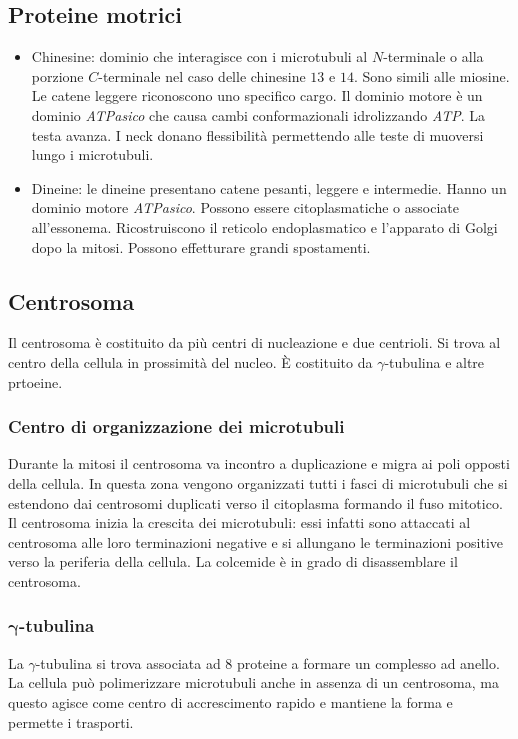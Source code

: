 	\subsection{Proteine motrici}
	\begin{multicols}{2}
		\begin{itemize}
			\item Chinesine: dominio che interagisce con i microtubuli al $N$-terminale o alla porzione $C$-terminale nel caso delle chinesine $13$ e $14$.
				Sono simili alle miosine.
				Le catene leggere riconoscono uno specifico cargo.
				Il dominio motore \`e un dominio \emph{ATPasico} che causa cambi conformazionali idrolizzando \emph{ATP}.
				La testa avanza.
				I neck donano flessibilit\`a permettendo alle teste di muoversi lungo i microtubuli.
			\item Dineine: le dineine presentano catene pesanti, leggere e intermedie.
				Hanno un dominio motore \emph{ATPasico}.
				Possono essere citoplasmatiche o associate all'essonema.
				Ricostruiscono il reticolo endoplasmatico e l'apparato di Golgi dopo la mitosi.
				Possono effetturare grandi spostamenti.
		\end{itemize}
	\end{multicols}

	\subsection{Centrosoma}
	Il centrosoma \`e costituito da pi\`u centri di nucleazione e due centrioli.
	Si trova al centro della cellula in prossimit\`a del nucleo.
	\`E costituito da $\gamma$-tubulina e altre prtoeine.

		\subsubsection{Centro di organizzazione dei microtubuli}
		Durante la mitosi il centrosoma va incontro a duplicazione e migra ai poli opposti della cellula.
		In questa zona vengono organizzati tutti i fasci di microtubuli che si estendono dai centrosomi duplicati verso il citoplasma formando il fuso mitotico.
		Il centrosoma inizia la crescita dei microtubuli: essi infatti sono attaccati al centrosoma alle loro terminazioni negative e si allungano le terminazioni positive verso la periferia della cellula.
		La colcemide \`e in grado di disassemblare il centrosoma.

		\subsubsection{$\mathbf{\gamma}$-tubulina}
		La $\gamma$-tubulina si trova associata ad $8$ proteine a formare un complesso ad anello.
		La cellula pu\`o polimerizzare microtubuli anche in assenza di un centrosoma, ma questo agisce come centro di accrescimento rapido e mantiene la forma e permette i trasporti.

